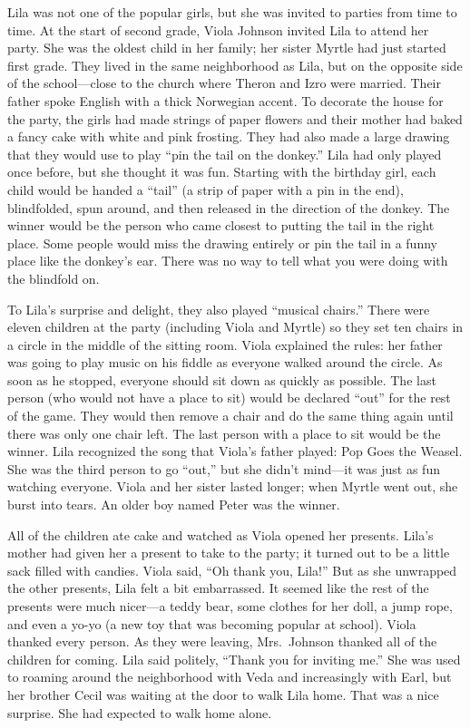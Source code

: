 \documentclass[
  american,
  letterpaper,
]{book}
\begin{document}
Lila was not one of the popular girls, but she was invited to parties
from time to time. At the start of second grade, Viola Johnson invited
Lila to attend her party. She was the oldest child in her family; her
sister Myrtle had just started first grade. They lived in the same
neighborhood as Lila, but on the opposite side of the school---close to
the church where Theron and Izro were married. Their father spoke
English with a thick Norwegian accent. To decorate the house for the
party, the girls had made strings of paper flowers and their mother had
baked a fancy cake with white and pink frosting. They had also made a
large drawing that they would use to play ``pin the tail on the
donkey.'' Lila had only played once before, but she thought it was fun.
Starting with the birthday girl, each child would be handed a ``tail''
(a strip of paper with a pin in the end), blindfolded, spun around, and
then released in the direction of the donkey. The winner would be the
person who came closest to putting the tail in the right place. Some
people would miss the drawing entirely or pin the tail in a funny place
like the donkey's ear. There was no way to tell what you were doing with
the blindfold on.

To Lila's surprise and delight, they also played ``musical chairs.''
There were eleven children at the party (including Viola and Myrtle) so
they set ten chairs in a circle in the middle of the sitting room. Viola
explained the rules: her father was going to play music on his fiddle as
everyone walked around the circle. As soon as he stopped, everyone
should sit down as quickly as possible. The last person (who would not
have a place to sit) would be declared ``out'' for the rest of the game.
They would then remove a chair and do the same thing again until there
was only one chair left. The last person with a place to sit would be
the winner. Lila recognized the song that Viola's father played: Pop
Goes the Weasel. She was the third person to go ``out,'' but she didn't
mind---it was just as fun watching everyone. Viola and her sister lasted
longer; when Myrtle went out, she burst into tears. An older boy named
Peter was the winner.

All of the children ate cake and watched as Viola opened her presents.
Lila's mother had given her a present to take to the party; it turned
out to be a little sack filled with candies. Viola said, ``Oh thank you,
Lila!'' But as she unwrapped the other presents, Lila felt a bit
embarrassed. It seemed like the rest of the presents were much nicer---a
teddy bear, some clothes for her doll, a jump rope, and even a yo-yo (a
new toy that was becoming popular at school). Viola thanked every
person. As they were leaving, Mrs.~Johnson thanked all of the children
for coming. Lila said politely, ``Thank you for inviting me.'' She was
used to roaming around the neighborhood with Veda and increasingly with
Earl, but her brother Cecil was waiting at the door to walk Lila home.
That was a nice surprise. She had expected to walk home alone.
\end{document}
